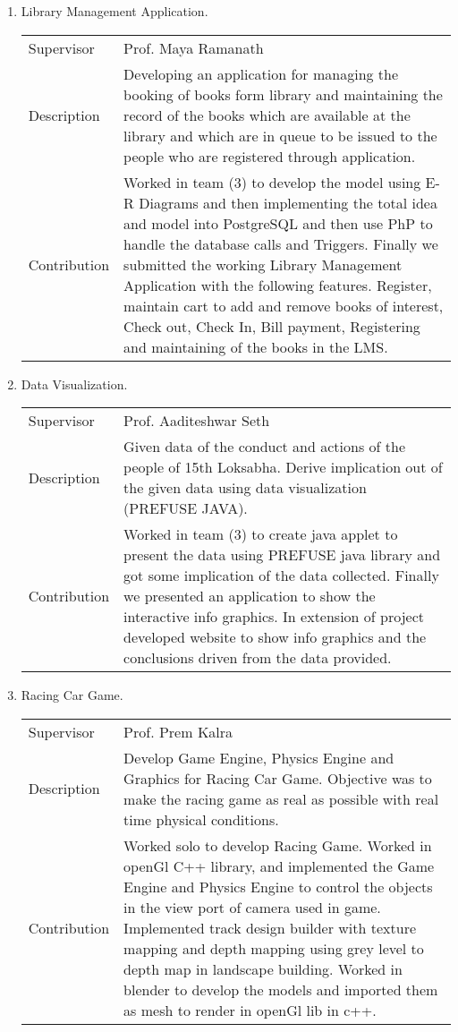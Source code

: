 \documentclass[letterpaper,11pt]{article}
\begin{document}
\begin{enumerate}
\item Library Management Application.
 \begin{center}
 \begin{tabular}{p{3cm} p{13cm} }
 Supervisor& Prof. Maya Ramanath\\
 Description& Developing an application for managing the booking of books form library and maintaining the record of the books which are available at the library and which are in queue to be issued to the people who are registered through
application.\\
Contribution&Worked in team (3) to develop the model using E-R Diagrams and then implementing the total idea and model into PostgreSQL and then use PhP to handle the database calls and Triggers. Finally we submitted the working Library
Management Application with the following features. Register, maintain cart to add and remove books of interest,
Check out, Check In, Bill payment, Registering and maintaining of the books in the LMS.\\
\end{tabular}
\end{center}

 \item Data Visualization.
 \begin{center}
 \begin{tabular}{p{3cm} p{13cm} }
 Supervisor& Prof. Aaditeshwar Seth\\
 Description&Given data of the conduct and actions of the people of 15th Loksabha. Derive implication out of the given data using data visualization (PREFUSE JAVA).\\
Contribution&Worked in team (3) to create java applet to present the data using PREFUSE java library and got some
implication of the data collected. Finally we presented an application to show the interactive info graphics. In
extension of project developed website to show info graphics and the conclusions driven from the data provided.\\
\end{tabular}
\end{center}

\item Racing Car Game.
 \begin{center}
 \begin{tabular}{p{3cm} p{13cm} }
 Supervisor& Prof. Prem Kalra\\
 Description&Develop Game Engine, Physics Engine and Graphics for Racing Car Game. Objective was to make the racing game as real as possible with real time physical conditions.\\
Contribution&Worked solo to develop Racing Game. Worked in openGl C++ library, and implemented the Game
Engine and Physics Engine to control the objects in the view port of camera used in game. Implemented track design
builder with texture mapping and depth mapping using grey level to depth map in landscape building. Worked in
blender to develop the models and imported them as mesh to render in openGl lib in c++.\\
\end{tabular}
\end{center}
\end{enumerate}
\end{document}
